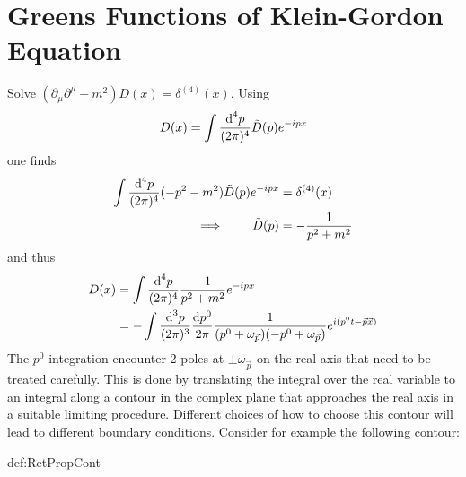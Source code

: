 \section{Greens Functions of Klein-Gordon Equation}
\label{sec:Apdx_GreensFunctionsKG}
Solve $(\partial_\mu\partial^\mu-m^2)D(x)=\delta^{(4)}(x)$. Using $$D(x)=\int\frac{\text{d}^4p}{(2\pi)^4}\tilde{D}(p)e^{-{i} px}$$ one finds
\begin{subequations}
    \begin{align}
        \int\frac{\text{d}^4p}{(2\pi)^4}(-p^2-m^2)\tilde{D}(p)e^{-{i} px}&=\delta^{(4)}(x)\\
        \implies\qquad\tilde{D}(p)&=-\frac{1}{p^2+m^2}
    \end{align}
\end{subequations}
    and thus
    \begin{subequations}
        \begin{align}
            D(x)&=\int\frac{\text{d}^4p}{(2\pi)^4}\frac{-1}{p^2+m^2}e^{-{i} px}\\
            &=-\int\frac{\text{d}^3p}{(2\pi)^3}\frac{\text{d} p^0}{2\pi}\frac{1}{(p^0+\omega_{\vec{p}})(-p^0+\omega_{\vec{p}})}e^{{i}(p^0t-\vec{p}\vec{x})}
        \end{align}
    \end{subequations}
The $p^0$-integration encounter 2 poles at ${\pm\omega_{\vec{p}}}$ on the real axis that need to be treated carefully. This is done by translating the integral over the real variable to an integral along a contour in the complex plane that approaches the real axis in a suitable limiting procedure. Different choices of how to choose this contour will lead to different boundary conditions. Consider for example the following contour:
\begin{defin}{def:RetPropCont}
        \centering
\end{defin}


